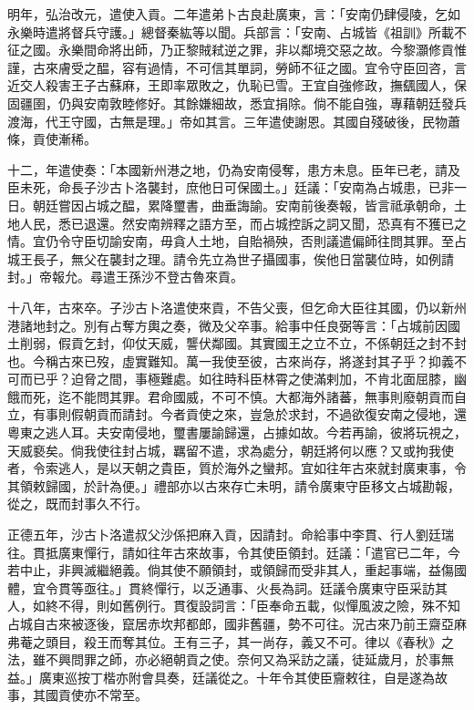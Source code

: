 \begin{pinyinscope}
明年，弘治改元，遣使入貢。二年遣弟卜古良赴廣東，言：「安南仍肆侵陵，乞如永樂時遣將督兵守護。」總督秦紘等以聞。兵部言：「安南、占城皆《祖訓》所載不征之國。永樂間命將出師，乃正黎賊弒逆之罪，非以鄰境交惡之故。今黎灝修貢惟謹，古來膚受之醖，容有過情，不可信其單詞，勞師不征之國。宜令守臣回咨，言近交人殺害王子古蘇麻，王即率眾敗之，仇恥已雪。王宜自強修政，撫颻國人，保固疆圉，仍與安南敦睦修好。其餘嫌細故，悉宜捐除。倘不能自強，專藉朝廷發兵渡海，代王守國，古無是理。」帝如其言。三年遣使謝恩。其國自殘破後，民物蕭條，貢使漸稀。

十二，年遣使奏：「本國新州港之地，仍為安南侵奪，患方未息。臣年已老，請及臣未死，命長子沙古卜洛襲封，庶他日可保國土。」廷議：「安南為占城患，已非一日。朝廷嘗因占城之醖，累降璽書，曲垂誨諭。安南前後奏報，皆言祗承朝命，土地人民，悉已退還。然安南辨釋之語方至，而占城控訴之詞又聞，恐真有不獲已之情。宜仍令守臣切諭安南，毋貪人土地，自貽禍殃，否則議遣偏師往問其罪。至占城王長子，無父在襲封之理。請令先立為世子攝國事，俟他日當襲位時，如例請封。」帝報允。尋遣王孫沙不登古魯來貢。

十八年，古來卒。子沙古卜洛遣使來貢，不告父喪，但乞命大臣往其國，仍以新州港諸地封之。別有占奪方輿之奏，微及父卒事。給事中任良弼等言：「占城前因國土削弱，假貢乞封，仰仗天威，讋伏鄰國。其實國王之立不立，不係朝廷之封不封也。今稱古來已歿，虛實難知。萬一我使至彼，古來尚存，將遂封其子乎？抑義不可而已乎？迫脅之間，事極難處。如往時科臣林霄之使滿剌加，不肯北面屈膝，幽餓而死，迄不能問其罪。君命國威，不可不慎。大都海外諸蕃，無事則廢朝貢而自立，有事則假朝貢而請封。今者貢使之來，豈急於求封，不過欲復安南之侵地，還粵東之逃人耳。夫安南侵地，璽書屢諭歸還，占據如故。今若再諭，彼將玩視之，天威褻矣。倘我使往封占城，羈留不遣，求為處分，朝廷將何以應？又或拘我使者，令索逃人，是以天朝之貴臣，質於海外之蠻邦。宜如往年古來就封廣東事，令其領敕歸國，於計為便。」禮部亦以古來存亡未明，請令廣東守臣移文占城勘報，從之，既而封事久不行。

正德五年，沙古卜洛遣叔父沙係把麻入貢，因請封。命給事中李貫、行人劉廷瑞往。貫抵廣東憚行，請如往年古來故事，令其使臣領封。廷議：「遣官已二年，今若中止，非興滅繼絕義。倘其使不願領封，或領歸而受非其人，重起事端，益傷國體，宜令貫等亟往。」貫終憚行，以乏通事、火長為詞。廷議令廣東守臣采訪其人，如終不得，則如舊例行。貫復設詞言：「臣奉命五載，似憚風波之險，殊不知占城自古來被逐後，竄居赤坎邦都郎，國非舊疆，勢不可往。況古來乃前王齋亞麻弗菴之頭目，殺王而奪其位。王有三子，其一尚存，義又不可。律以《春秋》之法，雖不興問罪之師，亦必絕朝貢之使。奈何又為采訪之議，徒延歲月，於事無益。」廣東巡按丁楷亦附會具奏，廷議從之。十年令其使臣齎敕往，自是遂為故事，其國貢使亦不常至。


\end{pinyinscope}
